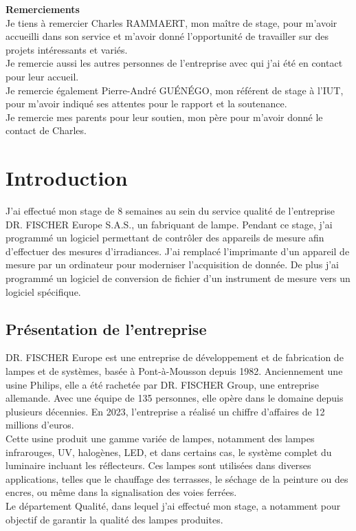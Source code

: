\documentclass[12pt]{article}
\begin{document}
\thispagestyle{empty}

\restoregeometry
\onehalfspacing
\newpage
\textbf{\Large{Remerciements}}\\

Je tiens à remercier Charles RAMMAERT, mon maître de stage, pour m'avoir accueilli dans son service et m'avoir donné l'opportunité de travailler sur des projets intéressants et variés.\\
Je remercie aussi les autres personnes de l'entreprise avec qui j'ai été en contact pour leur accueil.\\
Je remercie également Pierre-André GUÉNÉGO, mon référent de stage à l'IUT, pour m'avoir indiqué ses attentes pour le rapport et la soutenance.\\
Je remercie mes parents pour leur soutien, mon père pour m'avoir donné le contact de Charles.


\thispagestyle{empty}

\newpage
\singlespacing
\thispagestyle{empty}
\tableofcontents
\newpage
\onehalfspacing

\section{Introduction}

J'ai effectué mon stage de 8 semaines au sein du service qualité de l'entreprise DR. FISCHER Europe S.A.S., un fabriquant de lampe.
Pendant ce stage, j'ai programmé un logiciel permettant de contrôler des appareils de mesure afin d'effectuer des mesures d'irradiances.
J'ai remplacé l'imprimante d'un appareil de mesure par un ordinateur pour moderniser l'acquisition de donnée.
De plus j'ai programmé un logiciel de conversion de fichier d'un instrument de mesure vers un logiciel spécifique.


\newpage
\subsection{Présentation de l'entreprise}
DR. FISCHER Europe est une entreprise de développement et de fabrication de lampes et de systèmes, basée à Pont-à-Mousson depuis 1982.
Anciennement une usine Philips, elle a été rachetée par DR. FISCHER Group, une entreprise allemande.
Avec une équipe de 135 personnes, elle opère dans le domaine depuis plusieurs décennies.
En 2023, l'entreprise a réalisé un chiffre d'affaires de 12 millions d'euros.\\
Cette usine produit une gamme variée de lampes, notamment des lampes infrarouges, UV, halogènes, LED, et dans certains cas, le système complet du luminaire incluant les réflecteurs.
Ces lampes sont utilisées dans diverses applications, telles que le chauffage des terrasses, le séchage de la peinture ou des encres, ou même dans la signalisation des voies ferrées.\\
Le département Qualité, dans lequel j'ai effectué mon stage, a notamment pour objectif de garantir la qualité des lampes produites.
\newpage
\end{document}
